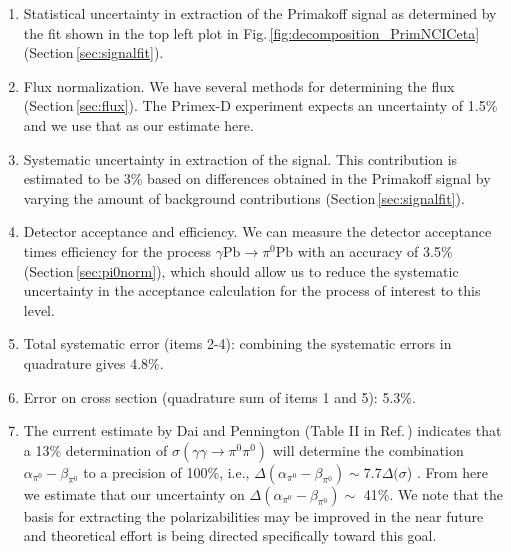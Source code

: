 \begin{enumerate}

\item
Statistical uncertainty in extraction of the Primakoff signal as determined by the fit shown in the top left plot in Fig.\,\ref{fig:decomposition_PrimNCICeta} (Section\,\ref{sec:signalfit}).

\item
Flux normalization. We have several methods for determining the flux (Section\,\ref{sec:flux}). The Primex-D experiment expects an uncertainty of 1.5\% and we use that as our estimate here.

\item
Systematic uncertainty in extraction of the signal. This contribution is estimated to be 3\% based on differences obtained in the Primakoff signal by varying the amount of background contributions (Section\,\ref{sec:signalfit}).

\item
Detector acceptance and efficiency. We can measure the detector acceptance times efficiency for the process $\gamma \mathrm{Pb} \rightarrow \pi^0 \mathrm{Pb}$ with an accuracy of 3.5\% (Section\,\ref{sec:pi0norm}), which
should allow us to reduce the systematic uncertainty in the acceptance calculation for the process of interest to this level.

\item
Total systematic error (items 2-4): combining the systematic errors in quadrature gives 4.8\%.

\item 
Error on cross section (quadrature sum of items 1 and 5): 5.3\%.

\item
The current estimate by Dai and Pennington (Table II in Ref.\,\cite{Dai:2016ytz}) indicates
that a 13\% determination of
$\sigma(\gamma\gamma\rightarrow\pi^0\pi^0)$ will determine the
combination $\alpha_{\pi^0}-\beta_{\pi^0}$ to a precision of 100\%, i.e., $\Delta(\alpha_{\pi^0}-\beta_{\pi^0}) \sim 7.7\Delta(\sigma$) .
From here we estimate that our uncertainty on $\Delta(\alpha_{\pi^0}-\beta_{\pi^0}) \sim$ 41\%. We note that the basis for extracting the polarizabilities may be improved
in the near future and theoretical effort is being directed specifically toward this goal.

\end{enumerate}

